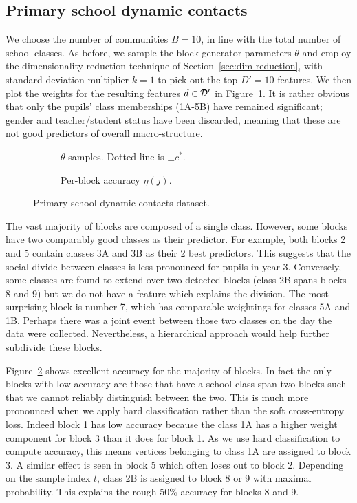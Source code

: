 \subsection{Primary school dynamic contacts}

We choose the number of communities $B=10$, in line with the total number of 
school classes. As before, we sample the block-generator parameters $\theta$ and 
employ the dimensionality reduction technique 
of Section~\ref{sec:dim-reduction},
with standard deviation multiplier $k=1$ to pick out the top $D'=10$ features. 
We then plot the weights for the resulting features $d \in \mathcal{D}'$ 
in Figure~\ref{fig:school-null}. It is rather obvious
that only the pupils' class memberships (1A-5B) have remained
significant;
gender and teacher/student status have been discarded,
meaning that these are not good predictors of overall macro-structure.
%
\begin{figure}[!h]
	\centering
	\begin{subfigure}[t]{0.45\linewidth}
		\centering
		\caption{$\theta$-samples. Dotted line is $\pm c^*$.}
		\label{fig:school-null}
	\end{subfigure}
	\begin{subfigure}[t]{0.45\linewidth}
		\centering
		\caption{Per-block accuracy $\eta(j)$.}
		\label{fig:school-accuracy}
	\end{subfigure}
	\caption{Primary school dynamic contacts dataset.}
	\label{fig:school}
\end{figure}

The vast majority of blocks are composed of a single class. 
However, some blocks have two comparably good classes as their predictor. 
For example, both blocks 2 and 5 contain classes 3A and 3B as their 2 best predictors. 
This suggests that the social divide between classes is less pronounced 
for pupils in year 3. Conversely, some classes are found to extend over two 
detected blocks (class 2B spans blocks 8 and 9) but we do 
not have a feature which explains the division. The most surprising block 
is number 7, which has comparable weightings for classes 5A and 1B. 
Perhaps there was a joint event between those two classes on the day 
the data were collected. Nevertheless, a hierarchical approach would help further subdivide these blocks.

Figure~\ref{fig:school-accuracy} shows excellent accuracy for the majority of blocks. In fact the only blocks with low accuracy are those that have a school-class span two blocks such that we cannot reliably distinguish between the two. This is much more pronounced when we apply hard classification rather than the soft cross-entropy loss. Indeed block 1 has low accuracy because the class 1A has a higher weight component for block 3 than it does for block 1. As we use hard classification to compute accuracy, this means vertices belonging to class 1A are assigned to block 3. A similar effect is seen in block 5 which often loses out to block 2. Depending on the sample index $t$, class 2B is assigned to block 8 or 9 with maximal probability. This explains the rough 50\% accuracy for blocks 8 and 9.

